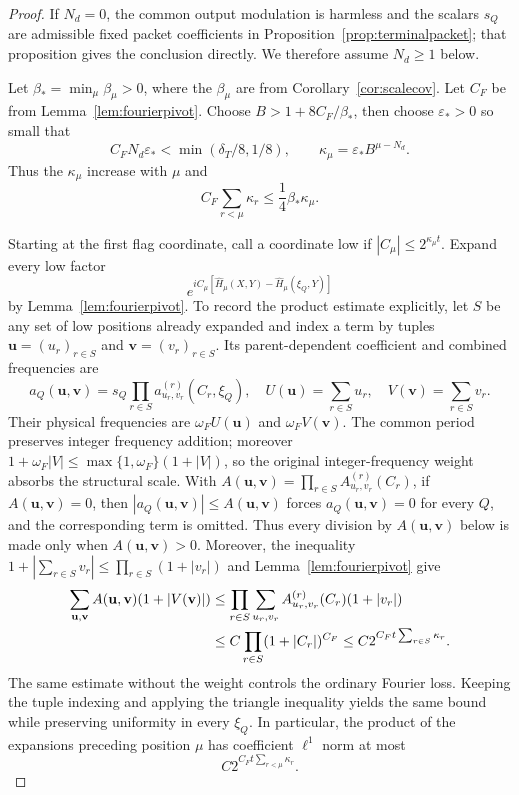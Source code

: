 \documentclass[11pt]{article}
\numberwithin{equation}{section}
\theoremstyle{remark}
\theoremstyle{definition}
\begin{document}
\begin{proof}
If $N_d=0$, the common output modulation is harmless and the scalars
$s_Q$ are admissible fixed packet coefficients in
Proposition~\ref{prop:terminalpacket}; that proposition gives the
conclusion directly.  We therefore assume $N_d\ge1$ below.

Let $\beta_* =\min_\mu\beta_\mu>0$, where the $\beta_\mu$ are from
Corollary~\ref{cor:scalecov}.  Let $C_F$ be from
Lemma~\ref{lem:fourierpivot}.  Choose $B>1+8C_F/\beta_*$, then choose
$\varepsilon_*>0$ so small that
\begin{equation}\label{eq:kappachoice}
 C_FN_d\varepsilon_*<\min(\delta_T/8,1/8),
 \qquad
 \kappa_\mu=\varepsilon_*B^{\mu-N_d}.
\end{equation}
Thus the $\kappa_\mu$ increase with $\mu$ and
\begin{equation}\label{eq:kappahierarchy}
 C_F\sum_{r<\mu}\kappa_r\le\frac14\beta_*\kappa_\mu.
\end{equation}

Starting at the first flag coordinate, call a coordinate low if
$|C_\mu|\le2^{\kappa_\mu t}$.  Expand every low factor
\[
 e^{iC_\mu[\widehat H_\mu(X,Y)-\widehat H_\mu(\xi_Q,Y)]}
\]
by Lemma~\ref{lem:fourierpivot}.  To record the product estimate explicitly,
let $S$ be any set of low positions already expanded and index a term by
tuples $\mathbf u=(u_r)_{r\in S}$ and
$\mathbf v=(v_r)_{r\in S}$.  Its parent-dependent coefficient and combined
frequencies are
 \[
 a_Q(\mathbf u,\mathbf v)
 =s_Q\prod_{r\in S}a^{(r)}_{u_r,v_r}(C_r,\xi_Q),
 \quad U(\mathbf u)=\sum_{r\in S}u_r,
 \quad V(\mathbf v)=\sum_{r\in S}v_r.
\]
Their physical frequencies are $\omega_F U(\mathbf u)$ and
$\omega_F V(\mathbf v)$.  The common period preserves integer frequency
addition; moreover $1+\omega_F|V|\le\max\{1,\omega_F\}(1+|V|)$,
so the original integer-frequency weight absorbs the structural scale.
With
$A(\mathbf u,\mathbf v)=\prod_{r\in S}A^{(r)}_{u_r,v_r}(C_r)$,
if $A(\mathbf u,\mathbf v)=0$, then
$|a_Q(\mathbf u,\mathbf v)|\le A(\mathbf u,\mathbf v)$ forces
$a_Q(\mathbf u,\mathbf v)=0$ for every $Q$, and the corresponding term is
omitted.  Thus every division by $A(\mathbf u,\mathbf v)$ below is made
only when $A(\mathbf u,\mathbf v)>0$.  Moreover,
the inequality
$1+|\sum_{r\in S}v_r|\le\prod_{r\in S}(1+|v_r|)$ and
Lemma~\ref{lem:fourierpivot} give
\begin{align}
 \sum_{\mathbf u,\mathbf v}A(\mathbf u,\mathbf v)
     (1+|V(\mathbf v)|)
 &\le\prod_{r\in S}\sum_{u_r,v_r}
 A^{(r)}_{u_r,v_r}(C_r)(1+|v_r|)\notag\\
 &\le C\prod_{r\in S}(1+|C_r|)^{C_F}
 \le C2^{C_Ft\sum_{r\in S}\kappa_r}.
 \label{eq:weighted-fourier-product}
\end{align}
The same estimate without the weight controls the ordinary Fourier loss.
Keeping the tuple indexing and applying the triangle inequality yields the
same bound while preserving uniformity in every $\xi_Q$.  In particular,
the product of the expansions preceding position
$\mu$ has coefficient $\ell^1$ norm at most
\begin{equation}\label{eq:fourierloss}
 C2^{C_Ft\sum_{r<\mu}\kappa_r}.
\end{equation}


\end{proof}
\end{document}
